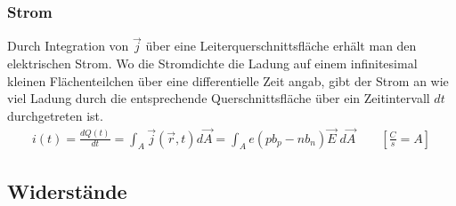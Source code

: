 \documentclass[12pt,a4paper]{article}%
\numberwithin{equation}{section}
\begin{document}
\subsubsection{Strom}
Durch Integration von $\vec{j}$ über eine Leiterquerschnittsfläche erhält man den elektrischen Strom. Wo die Stromdichte die Ladung auf einem infinitesimal kleinen Flächenteilchen über eine differentielle Zeit angab, gibt der Strom an wie viel Ladung durch die entsprechende Querschnittsfläche über ein Zeitintervall $dt$ durchgetreten ist.
\begin{align}
i(t) = \frac{dQ(t)}{dt} = \int_A \vec{j}(\vec{r},t) d\vec{A} = \int_A e(pb_p - nb_n)\vec{E} \; d\vec{A} \qquad \left[\frac{C}{s} = A \right] \label{eq:current_2_curr}
\end{align}

\subsection{Widerstände}
\end{document}
